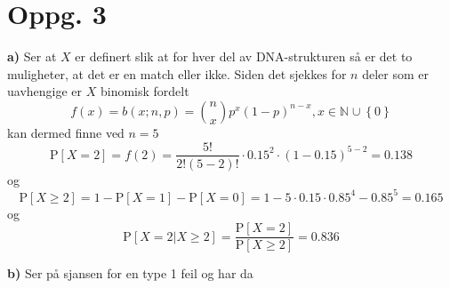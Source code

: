 \documentclass{report}
\newcommand{\M}[2]{\mathbb{#1}^{#2}}
\newcommand{\bbrack}[1]{\left[ #1 \right]}
\newcommand{\cbrack}[1]{\left\lbrace #1 \right\rbrace}
\newcommand{\Prob}[1]{\text{P} \bbrack{ #1 }}
\begin{document}
\section*{Oppg. 3}
\textbf{a)}
Ser at $X$ er definert slik at for hver del av DNA-strukturen så er det to muligheter, at det er en match eller ikke. Siden det sjekkes for $n$ deler som er uavhengige er $X$ binomisk fordelt
\begin{equation}
  \label{eq:4}
  f(x) = b(x; n, p) = \binom{n}{x} p^{x}(1-p)^{n-x}, x \in \M{N}{} \cup \cbrack{0}
\end{equation}
kan dermed finne ved $n=5$
\begin{equation}
  \label{eq:14}
  \Prob{X=2} = f(2) = \frac{5!}{2!(5-2)!} \cdot 0.15^{2} \cdot (1-0.15)^{5-2} = 0.138
\end{equation}
og
\begin{equation}
  \label{eq:15}
  \Prob{X \geq 2} = 1 - \Prob{X=1} - \Prob{X=0} = 1 - 5\cdot 0.15 \cdot 0.85^{4} - 0.85^{5} = 0.165
\end{equation}
og
\begin{equation}
  \label{eq:16}
  \Prob{X = 2 | X \geq 2} = \frac{\Prob{X=2}}{\Prob{X \geq 2}} = 0.836
\end{equation}

\textbf{b)}
Ser på sjansen for en type 1 feil og har da
\end{document}
